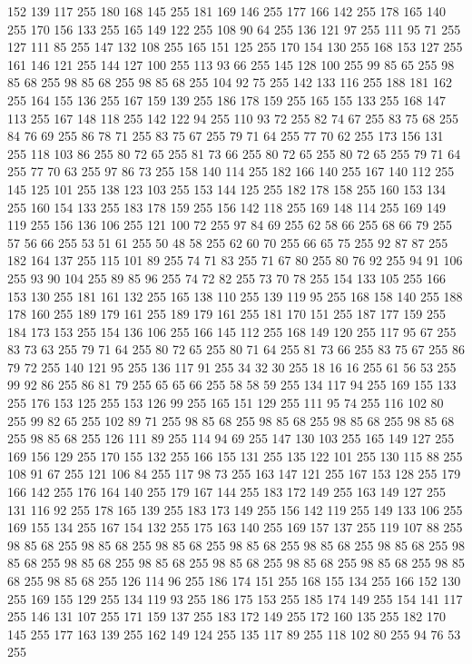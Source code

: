152 139 117 255 180 168 145 255 181 169 146 255 177 166 142 255 178 165 140 255 170 156 133 255 165 149 122 255 108 90 64 255 136 121 97 255 111 95 71 255 127 111 85 255 147 132 108 255 165 151 125 255 170 154 130 255 168 153 127 255 161 146 121 255 144 127 100 255 113 93 66 255 145 128 100 255 99 85 65 255 98 85 68 255 98 85 68 255 98 85 68 255 104 92 75 255 142 133 116 255 188 181 162 255 164 155 136 255 167 159 139 255 186 178 159 255 165 155 133 255 168 147 113 255 167 148 118 255 142 122 94 255 110 93 72 255 82 74 67 255 83 75 68 255 84 76 69 255 86 78 71 255 83 75 67 255 79 71 64 255 77 70 62 255 173 156 131 255 118 103 86 255 80 72 65 255 81 73 66 255 80 72 65 255 80 72 65 255 79 71 64 255 77 70 63 255 97 86 73 255 158 140 114 255 182 166 140 255 167 140 112 255 145 125 101 255 138 123 103 255 153 144 125 255 182 178 158 255 160 153 134 255 160 154 133 255 183 178 159 255 156 142 118 255 169 148 114 255 169 149 119 255 156 136 106 255
121 100 72 255 97 84 69 255 62 58 66 255 68 66 79 255 57 56 66 255 53 51 61 255 50 48 58 255 62 60 70 255 66 65 75 255 92 87 87 255 182 164 137 255 115 101 89 255 74 71 83 255 71 67 80 255 80 76 92 255 94 91 106 255 93 90 104 255 89 85 96 255 74 72 82 255 73 70 78 255 154 133 105 255 166 153 130 255 181 161 132 255 165 138 110 255 139 119 95 255 168 158 140 255 188 178 160 255 189 179 161 255 189 179 161 255 181 170 151 255 187 177 159 255 184 173 153 255 154 136 106 255 166 145 112 255 168 149 120 255 117 95 67 255 83 73 63 255 79 71 64 255 80 72 65 255 80 71 64 255 81 73 66 255 83 75 67 255 86 79 72 255 140 121 95 255 136 117 91 255 34 32 30 255 18 16 16 255 61 56 53 255 99 92 86 255 86 81 79 255 65 65 66 255 58 58 59 255 134 117 94 255 169 155 133 255 176 153 125 255 153 126 99 255 165 151 129 255 111 95 74 255 116 102 80 255 99 82 65 255 102 89 71 255 98 85 68 255 98 85 68 255 98 85 68 255
98 85 68 255 98 85 68 255 126 111 89 255 114 94 69 255 147 130 103 255 165 149 127 255 169 156 129 255 170 155 132 255 166 155 131 255 135 122 101 255 130 115 88 255 108 91 67 255 121 106 84 255 117 98 73 255 163 147 121 255 167 153 128 255 179 166 142 255 176 164 140 255 179 167 144 255 183 172 149 255 163 149 127 255 131 116 92 255 178 165 139 255 183 173 149 255 156 142 119 255 149 133 106 255 169 155 134 255 167 154 132 255 175 163 140 255 169 157 137 255 119 107 88 255 98 85 68 255 98 85 68 255 98 85 68 255 98 85 68 255 98 85 68 255 98 85 68 255 98 85 68 255 98 85 68 255 98 85 68 255 98 85 68 255 98 85 68 255 98 85 68 255 98 85 68 255 98 85 68 255 126 114 96 255 186 174 151 255 168 155 134 255 166 152 130 255 169 155 129 255 134 119 93 255 186 175 153 255 185 174 149 255 154 141 117 255 146 131 107 255 171 159 137 255 183 172 149 255 172 160 135 255 182 170 145 255 177 163 139 255 162 149 124 255 135 117 89 255 118 102 80 255 94 76 53 255
